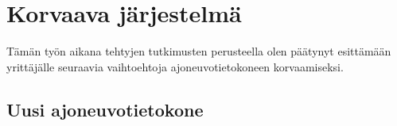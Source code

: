 




\newpage

%


\chapter{Korvaava järjestelmä}
\label{ch:korvaava_jarjestelma}

Tämän työn aikana tehtyjen tutkimusten perusteella olen päätynyt esittämään yrittäjälle seuraavia vaihtoehtoja ajoneuvotietokoneen korvaamiseksi.

\section{Uusi ajoneuvotietokone}

